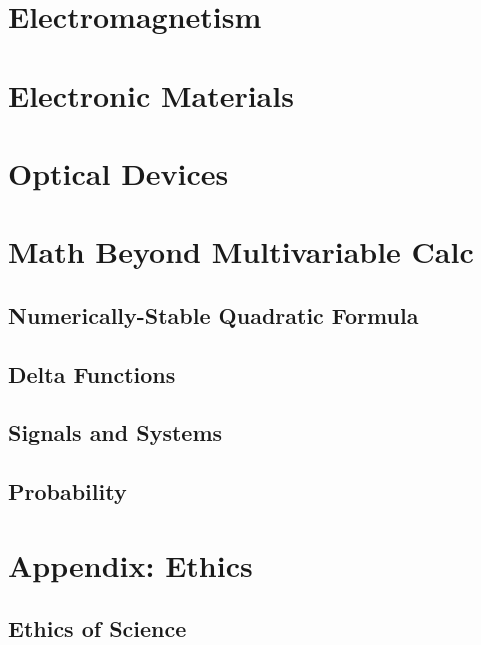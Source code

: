 \documentclass[12pt]{report}
\begin{document}
\newpage
\chapter{Electromagnetism}


\newpage
\chapter{Electronic Materials}

\newpage
\chapter{Optical Devices}

\newpage
\chapter{Math Beyond Multivariable Calc}
\section{Numerically-Stable Quadratic Formula}
\section{Delta Functions}
\section{Signals and Systems}
\section{Probability}


\newpage
\chapter{Appendix: Ethics}
\section{Ethics of Science}
\end{document}

